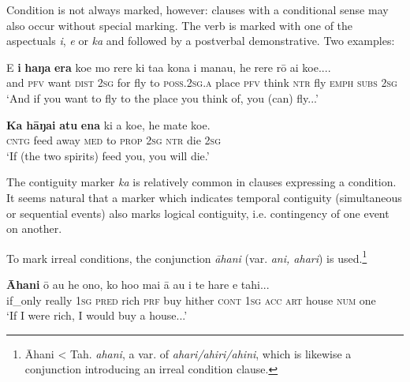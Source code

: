 Condition is not always marked, however: clauses with a conditional sense may also occur without special marking. The verb is marked with one of the aspectuals \textit{i}, \textit{e} or \textit{ka} and followed by a postverbal demonstrative. Two examples:

\ea\label{ex:11.262}
\gll {\ꞌ}E \textbf{i} \textbf{haŋa} \textbf{era} koe mo rere ki ta{\ꞌ}a kona i mana{\ꞌ}u,  he rere rō {\ꞌ}ai koe....\\
and \textsc{pfv} want \textsc{dist} \textsc{2sg} for fly to \textsc{poss.2sg.a} place \textsc{pfv} think  \textsc{ntr} fly \textsc{emph} \textsc{subs} \textsc{2sg}\\

\glt 
‘And if you want to fly to the place you think of, you (can) fly...’ \textstyleExampleref{[R378.006]} 
\z

\ea\label{ex:11.263}
\gll \textbf{Ka} \textbf{hāŋai} \textbf{atu} \textbf{ena} ki a koe, he mate koe. \\
\textsc{cntg} feed away \textsc{med} to \textsc{prop} \textsc{2sg} \textsc{ntr} die \textsc{2sg} \\

\glt
‘If (the two spirits) feed you, you will die.’ \textstyleExampleref{[R310.061]} 
\z

The contiguity marker \textit{ka} is relatively common in clauses expressing a condition. It seems natural that a marker which indicates temporal contiguity (simultaneous or sequential events) also marks logical contiguity, i.e. contingency of one event on another.

To mark irreal conditions, the conjunction \textit{{\ꞌ}āhani} (var. \textit{{\ꞌ}ani, {\ꞌ}ahari}) is used.\footnote{\label{fn:534}{\ꞌ}Āhani {\textless} Tah. \textit{{\ꞌ}ahani}, a var. of \textit{{\ꞌ}ahari/{\ꞌ}ahiri/{\ꞌ}ahini}, which is likewise a conjunction introducing an irreal condition clause.}

\ea\label{ex:11.264}
\gll \textbf{{\ꞌ}Āhani} {\ꞌ}ō au he {\ꞌ}ono, ko ho{\ꞌ}o mai {\ꞌ}ā au i te hare e tahi... \\
if\_only really \textsc{1sg} \textsc{pred} rich \textsc{prf} buy hither \textsc{cont} \textsc{1sg} \textsc{acc} \textsc{art} house \textsc{num} one \\

\glt 
‘If I were rich, I would buy a house...’ \textstyleExampleref{[R399.182]} 
\z


